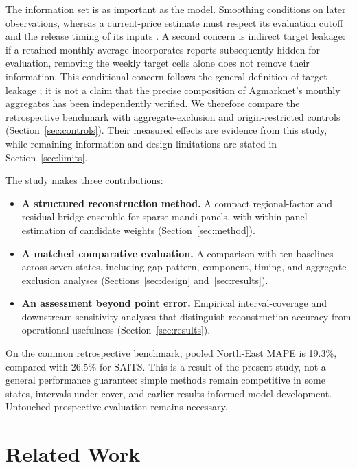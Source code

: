 \documentclass[sigconf,nonacm,balance=false]{acmart}
\begin{document}
The information set is as important as the model. Smoothing conditions on later observations, whereas a current-price estimate must respect its evaluation cutoff and the release timing of its inputs \cite{durbin2012,giannone2008}. A second concern is indirect target leakage: if a retained monthly average incorporates reports subsequently hidden for evaluation, removing the weekly target cells alone does not remove their information. This conditional concern follows the general definition of target leakage \cite{kaufman2012,kapoor2023}; it is not a claim that the precise composition of Agmarknet's monthly aggregates has been independently verified. We therefore compare the retrospective benchmark with aggregate-exclusion and origin-restricted controls (Section~\ref{sec:controls}). Their measured effects are evidence from this study, while remaining information and design limitations are stated in Section~\ref{sec:limits}.

\begin{samepage}
The study makes three contributions:
\begin{itemize}
\item \textbf{A structured reconstruction method.} A compact regional-factor and residual-bridge ensemble for sparse mandi panels, with within-panel estimation of candidate weights (Section~\ref{sec:method}).
\item \textbf{A matched comparative evaluation.} A comparison with ten baselines across seven states, including gap-pattern, component, timing, and aggregate-exclusion analyses (Sections~\ref{sec:design} and~\ref{sec:results}).
\item \textbf{An assessment beyond point error.} Empirical interval-coverage and downstream sensitivity analyses that distinguish reconstruction accuracy from operational usefulness (Section~\ref{sec:results}).
\end{itemize}
\end{samepage}

On the common retrospective benchmark, pooled North-East MAPE is 19.3\%, compared with 26.5\% for SAITS. This is a result of the present study, not a general performance guarantee: simple methods remain competitive in some states, intervals under-cover, and earlier results informed model development. Untouched prospective evaluation remains necessary.

\section{Related Work}
\end{document}
